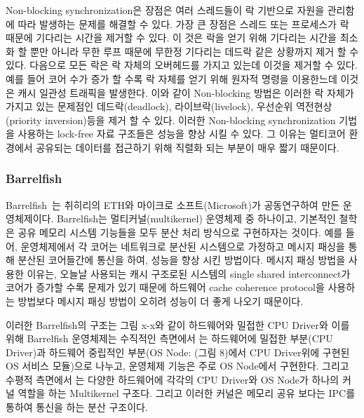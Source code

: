 Non-blocking synchronization은 장점은 여러 스레드들이 락 기반으로 자원을 관리함에 따라
 발생하는 문제를 해결할 수 있다. 
가장 큰 장점은 스레드 또는 프로세스가 락 때문에 기다리는 시간을 제거할 수 있다.
이 것은 락을 얻기 위해 기다리는 시간을 최소화 할 뿐만 아니라 무한 루프 때문에 무한정 기다리는 
데드락 같은 상황까지 제거 할 수 있다. 
다음으로 모든 락은 락 자체의 오버헤드를 가지고 있는데 이것을 제거할 수 있다. 
예를 들어 코어 수가 증가 할 수록 락 자체를 얻기 위해 원자적 명령을 이용한느데 이것은 캐시 일관성 트래픽을 
발생한다. 
이와 같이 Non-blocking 방법은 이러한 락 자체가 가지고 있는 문제점인 데드락(deadlock), 라이브락(livelock), 
우선순위 역전현상(priority inversion)등을 제거 할 수 있다. 
이러한 Non-blocking synchronization 기법을 사용하는 lock-free 자료 구조들은 성능을 향상 시킬 수 있다. 
그 이유는 멀티코어 환경에서 공유되는 데이터를 접근하기 위해 직렬화 되는 부분이 매우 짧기 때문이다. 

\subsubsection{Barrelfish}


Barrelfish~\cite{Baumann2009Barrelfish}는 취히리의 ETH와 마이크로 소프트(Microsoft)가
공동연구하여 만든 운영체제이다.
Barrelfish는 멀티커널(multikernel) 운영체제 중 하나이고, 
기본적인 철학은 공유 메모리 시스템 기능들을 모두 분산 처리 방식으로 구현하자는 것이다.
예를 들어, 운영체제에서 각 코어는 네트워크로 분산된 시스템으로 가정하고 메시지 패싱을 통해 분산된 
코어들간에 통신을 하여, 성능을 향상 시킨 방법이다. 
메시지 패싱 방법을 사용한 이유는, 오늘날 사용되는 캐시 구조로된 시스템의 
single shared interconnect가 코어가 증가할 수록 문제가 있기 때문에 하드웨어 cache coherence
protocol을 사용하는 방법보다 메시지 패싱 방법이 오히려 성능이 더 좋게 나오기 때문이다. 


이러한 Barrelfish의 구조는 그림 x-x와 같이 하드웨어와 밀접한 CPU Driver와 이를 위해 Barrelfish 운영체제는
수직적인 측면에서 는 하드웨어에 밀접한 부분(CPU Driver)과 하드웨어 중립적인 부분(OS Node: (그림 8)에서 CPU
Driver위에 구현된 OS 서비스 모듈)으로 나누고, 운영체제 기능은 주로 OS Node에서 구현한다.
그리고 수평적 측면에서 는 다양한 하드웨어에 각각의 CPU Driver와 OS Node가 하나의 커널 역할을 하는 Multikernel
구조다. 그리고 이러한 커널은 메모리 공유 보다는 IPC를 통하여 통신을 하는 분산 구조이다.
 
